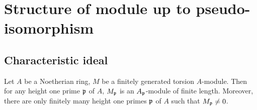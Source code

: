 \section{Structure of module up to pseudo-isomorphism}

\subsection{Characteristic ideal}

\begin{prop}
\label{char-ideal-preliminary}
\leanok
Let $A$ be a Noetherian ring, $M$ be a
finitely generated torsion $A$-module.
Then for any height one prime ${\mathfrak{p}}$ of $A$,
$M_{\mathfrak{p}}$ is an $A_{\mathfrak{p}}$-module of finite length. Moreover, there are only finitely
many height one primes ${\mathfrak{p}}$ of $A$ such that $M_{\mathfrak{p}}\neq 0$.
\end{prop}

